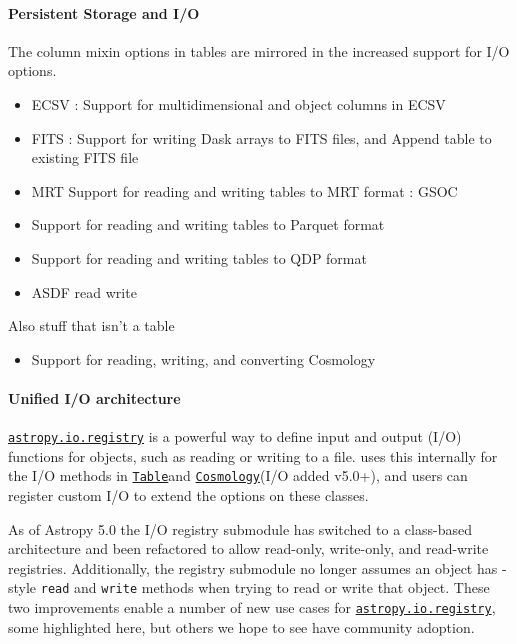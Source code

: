 \documentclass[modern]{aastex631}
\newcommand{\astropyiosubpkg}[1]{\href{http://docs.astropy.org/en/stable/io/#1/index.html}{\texttt{astropy.io.#1}}\xspace}
\newcommand{\astropyapi}[2]{\href{https://docs.astropy.org/en/stable/api/astropy.#1.html}{#2}}
\newcommand{\astropyapidoc}[2]{\astropyapi{#1}{\texttt{#2}\xspace}}
\newcommand{\astropyCosmology}{\astropyapidoc{cosmology.Cosmology}{Cosmology}}
\newcommand{\astropyTable}{\astropyapidoc{table.Table}{Table}}
\begin{document}
  \paragraph{Persistent Storage and I/O}

    The column mixin options in tables are mirrored in the increased support for
    I/O options.

    \begin{itemize}
      \item ECSV : Support for multidimensional and object columns in ECSV
      \item FITS : Support for writing Dask arrays to FITS files, and Append table to existing FITS file
      \item MRT Support for reading and writing tables to MRT format : GSOC
      \item Support for reading and writing tables to Parquet format
      \item Support for reading and writing tables to QDP format
      \item ASDF read write
    \end{itemize}
    
    Also stuff that isn't a table

    \begin{itemize}
      \item Support for reading, writing, and converting Cosmology
    \end{itemize}


  \paragraph{Unified I/O architecture}

    \astropyiosubpkg{registry} is a powerful way to define input and output
    (I/O) functions for \astropypkg objects, such as reading or writing to a
    file. \astropy uses this internally for the I/O methods in \astropyTable and
    \astropyCosmology (I/O added v5.0+), and users can register custom I/O to
    extend the options on these classes.

    As of Astropy 5.0 the I/O registry submodule has switched to a class-based
    architecture and been refactored to allow read-only, write-only, and
    read-write registries. Additionally, the registry submodule no longer
    assumes an object has \astropy-style \texttt{read} and \texttt{write}
    methods when trying to read or write that object. These two improvements
    enable a number of new use cases for \astropyiosubpkg{registry}, some
    highlighted here, but others we hope to see have community adoption.
\end{document}
